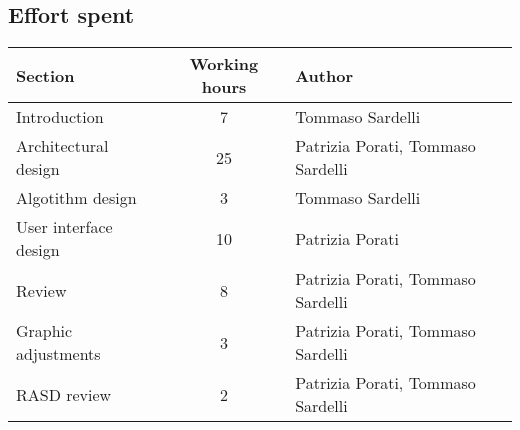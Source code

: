 \pagebreak

\subsection{Effort spent}

\begin{center}
	\vspace{0.2cm}
	\begin{tabular}{ l c l } 
		\hline
		Section 					& Working hours 	& Author \\ 
		\hline
		Introduction				& 7 				& Tommaso Sardelli	\\
		Architectural design		& 25 				& Patrizia Porati, Tommaso Sardelli	\\
		Algotithm design	 		& 3				 	& Tommaso Sardelli \\ 
		User interface design		& 10 				& Patrizia Porati	\\
		Review						& 8					& Patrizia Porati, Tommaso Sardelli \\
		Graphic adjustments			& 3 				& Patrizia Porati, Tommaso Sardelli \\
		RASD review					& 2 				& Patrizia Porati, Tommaso Sardelli \\
		\hline
	\end{tabular}
\end{center}
